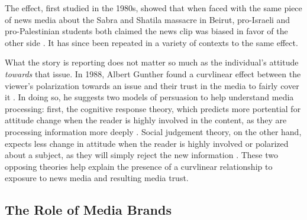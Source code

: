 The effect, first studied in the 1980s, showed that when faced with the same piece of news media about the Sabra and Shatila massacre in Beirut, pro-Israeli and pro-Palestinian students both claimed the news clip was biased in favor of the other side 
 \cite{vallone1985hostile}. It has since been repeated in a variety of contexts to the same effect.

What the story is reporting does not matter so much as the individual's attitude \emph{towards} that issue. In 1988, Albert Gunther found a curvlinear effect between the viewer's polarization towards an issue and their trust in the media to fairly cover it \cite{gunther1988attitude}. In doing so, he suggests two models of persuasion to help understand media processing: first, the cognitive response theory, which predicts more portential for attitude change when the reader is highly involved in the content, as they are processing information more deeply \cite{cacioppo1979effects}. Social judgement theory, on the other hand, expects less change in attitude when the reader is highly involved or polarized about a subject, as they will simply reject the new information \cite{sherif1961social}. These two opposing theories help explain the presence of a curvlinear relationship to exposure to news media and resulting media trust.





 
  

\subsection{The Role of Media Brands}






 






